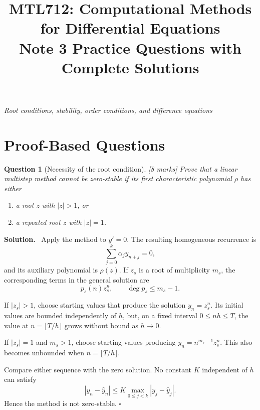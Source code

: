 \documentclass[11pt,a4paper]{article}
\title{\textcolor{titleblue}{\textbf{MTL712: Computational Methods for Differential Equations}}\\[5pt]
\large Note 3 Practice Questions with Complete Solutions}
\author{}
\date{}
\theoremstyle{questionstyle}
\newtheorem{question}{Question}
\newenvironment{solution}
  {\par\noindent\textbf{\color{solutiongreen}Solution.}\ }
  {\hfill$\square$\par}
\newcommand{\pointmark}[1]{\hfill\textnormal{\textit{[#1 marks]}}}
\newcommand{\abs}[1]{\left|#1\right|}
\begin{document}
\maketitle
\thispagestyle{plain}

\begin{center}
\emph{Root conditions, stability, order conditions, and difference equations}
\end{center}

\tableofcontents
\clearpage

\section{Proof-Based Questions}

\begin{question}[Necessity of the root condition]\pointmark{8}
Prove that a linear multistep method cannot be zero-stable if its first
characteristic polynomial \(\rho\) has either
\begin{enumerate}[label=(\alph*)]
  \item a root \(z\) with \(\abs{z}>1\), or
  \item a repeated root \(z\) with \(\abs{z}=1\).
\end{enumerate}
\end{question}

\begin{solution}
Apply the method to \(y'=0\).  The resulting homogeneous recurrence is
\[
  \sum_{j=0}^{k}\alpha_jy_{n+j}=0,
\]
and its auxiliary polynomial is \(\rho(z)\).  If \(z_s\) is a root of
multiplicity \(m_s\), the corresponding terms in the general solution
are
\[
  p_s(n)z_s^n,\qquad \deg p_s\leq m_s-1.
\]

If \(\abs{z_s}>1\), choose starting values that produce the solution
\(y_n=z_s^n\).  Its initial values are bounded independently of \(h\),
but, on a fixed interval \(0\leq nh\leq T\), the value at
\(n=\lfloor T/h\rfloor\) grows without bound as \(h\to0\).

If \(\abs{z_s}=1\) and \(m_s>1\), choose starting values producing
\(y_n=n^{m_s-1}z_s^n\).  This also becomes unbounded when
\(n=\lfloor T/h\rfloor\).

Compare either sequence with the zero solution.  No constant \(K\)
independent of \(h\) can satisfy
\[
  \abs{y_n-\widehat y_n}
  \leq K\max_{0\leq j<k}\abs{y_j-\widehat y_j}.
\]
Hence the method is not zero-stable.
\end{solution}
\end{document}
